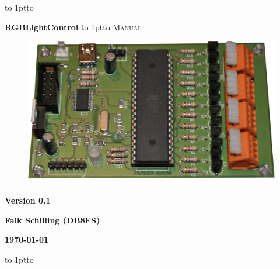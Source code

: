 \documentclass[12pt,a4paper]{article}
\numberwithin{equation}{section}
\numberwithin{table}{subsection}
\newcommand*{\colhrule}{\vbox to 1pt{\hbox
    to\textwidth{\textcolor{colHrule}{\hrulefill}}\vss}}
\theoremstyle{mdef}
\begin{document}

\vspace{-1cm}
\enlargethispage{3cm}
\begin{titlepage}
    \colhrule
    \begin{center}    
      {\color{colTitle}\Large \bf\sffamily 
        RGBLightControl}
      \colhrule
      \vspace*{1.7cm}
      {\Large \textsc{Manual}\vspace{0.2cm}}\\
      \vspace{0.2cm}
      
      \vspace*{0.4cm}

      \vspace*{0.4cm}
      
      \vspace{0.4cm}
      
      \begin{figure}[H]
        \centering
        \includegraphics[scale=0.3]{images/Platine-Screenshot.jpg}
      \end{figure}
      
      \vspace{0.4cm}
      
      \textbf{\textsf{\small Version 0.1}}
      \vspace{1.0cm}

      \textbf{\textsf{\small Falk Schilling (DB8FS)}}
      \vspace{1.0cm}

      \textbf{\textsf{\small \today}}
      \vspace{0.4cm}
      

      \vspace{2.2cm} 
    \end{center}
    \colhrule
\end{titlepage}
\end{document}
